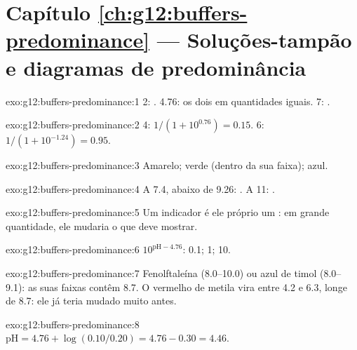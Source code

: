 \section*{Capítulo \ref{ch:g12:buffers-predominance} --- Soluções-tampão e diagramas de predominância}

\begin{solution}{exo:g12:buffers-predominance:1}
 2: .  4.76: os dois em quantidades iguais.  7: .
\end{solution}

\begin{solution}{exo:g12:buffers-predominance:2}
 4: $1/(1 + 10^{0.76}) = 0.15$.  6: $1/(1 + 10^{-1.24}) = 0.95$.
\end{solution}

\begin{solution}{exo:g12:buffers-predominance:3}
Amarelo; verde (dentro da sua faixa); azul.
\end{solution}

\begin{solution}{exo:g12:buffers-predominance:4}
A  7.4, abaixo de 9.26: . A  11: .
\end{solution}

\begin{solution}{exo:g12:buffers-predominance:5}
Um indicador é ele próprio um : em grande quantidade, ele
mudaria o  que deve mostrar.
\end{solution}

\begin{solution}{exo:g12:buffers-predominance:6}
$10^{\mathrm{pH} - 4.76}$: 0.1; 1; 10.
\end{solution}

\begin{solution}{exo:g12:buffers-predominance:7}
Fenolftaleína (8.0--10.0) ou azul de timol (8.0--9.1): as suas faixas
contêm 8.7. O vermelho de metila vira entre 4.2 e 6.3, longe de 8.7: ele
já teria mudado muito antes.
\end{solution}

\begin{solution}{exo:g12:buffers-predominance:8}
$\mathrm{pH} = 4.76 + \log(0.10/0.20) = 4.76 - 0.30 = 4.46$.
\end{solution}

